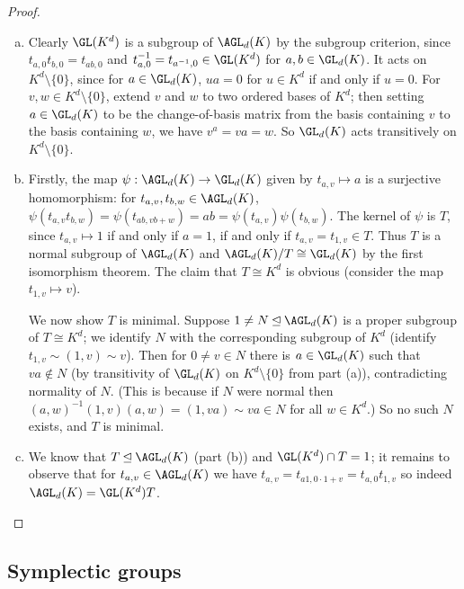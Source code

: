 \begin{proof}
    \begin{enumerate}[(a)]
        \item Clearly $\GL(K^d)$ is a subgroup of $\AGL_d(K)$ by the subgroup criterion, since $t_{a,0}t_{b,0} = t_{ab,0}$ and $t_{a,0}^{-1} = t_{a^{-1},0} \in \GL(K^d)$ for $a,b \in \GL_d(K)$. It acts on $K^d \setminus \{0\}$, since for $a \in \GL_d(K)$, $ua = 0$ for $u \in K^d$ if and only if $u = 0$. For $v,w \in K^d \setminus \{0\}$, extend $v$ and $w$ to two ordered bases of $K^d$; then setting $a \in \GL_d(K)$ to be the change-of-basis matrix from the basis containing $v$ to the basis containing $w$, we have $v^a = va = w$. So $\GL_d(K)$ acts transitively on $K^d \setminus \{0\}$.
        \item Firstly, the map $\psi : \AGL_d(K) \to \GL_d(K)$ given by $t_{a,v} \mapsto a$ is a surjective homomorphism: for $t_{a,v},t_{b,w} \in \AGL_d(K)$, $\psi(t_{a,v}t_{b,w}) = \psi(t_{ab,vb+w}) = ab = \psi(t_{a,v})\psi(t_{b,w})$. The kernel of $\psi$ is $T$, since $t_{a,v} \mapsto 1$ if and only if $a = 1$, if and only if $t_{a,v} = t_{1,v} \in T$. Thus $T$ is a normal subgroup of $\AGL_d(K)$ and $\AGL_d(K)/T \cong \GL_d(K)$ by the first isomorphism theorem. The claim that $T \cong K^d$ is obvious (consider the map $t_{1,v} \mapsto v$).

              We now show $T$ is minimal. Suppose $1 \neq N \unlhd \AGL_d(K)$ is a proper subgroup of $T \cong K^d$; we identify $N$ with the corresponding subgroup of $K^d$ (identify $t_{1,v} \sim (1,v) \sim v$). Then for $0 \neq v \in N$ there is $a \in \GL_d(K)$ such that $va \not\in N$ (by transitivity of $\GL_d(K)$ on $K^d \setminus \{0\}$ from part (a)), contradicting normality of $N$. (This is because if $N$ were normal then $(a,w)^{-1}(1,v)(a,w) = (1,va) \sim va \in N$ for all $w \in K^d$.) So no such $N$ exists, and $T$ is minimal.
        \item We know that $T \unlhd \AGL_d(K)$ (part (b)) and $\GL(K^d) \cap T = 1$; it remains to observe that for $t_{a,v} \in \AGL_d(K)$ we have $t_{a,v} = t_{a1,0 \cdot 1+v} = t_{a,0}t_{1,v}$ so indeed $\AGL_d(K) = \GL(K^d)T$.
    \end{enumerate}
\end{proof}

\subsection{Symplectic groups}

